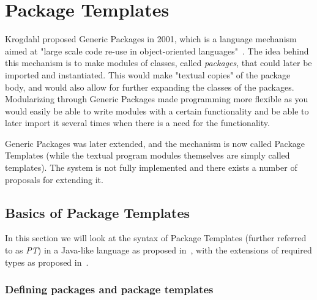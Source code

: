 \section{Package Templates}\label{sec:package-templates}


Krogdahl proposed Generic Packages in 2001, which is a language mechanism aimed at "large scale code re-use in object-oriented languages"~\cite{krogdahl:GP}.
The idea behind this mechanism is to make modules of classes, called \textit{packages}, that could later be imported and instantiated.
This would make "textual copies" of the package body, and would also allow for further expanding the classes of the packages.
Modularizing through Generic Packages made programming more flexible as you would easily be able to write modules with a certain functionality and be able to later import it several times when there is a need for the functionality.

Generic Packages was later extended, and the mechanism is now called Package Templates (while the textual program modules themselves are simply called templates).
The system is not fully implemented and there exists a number of proposals for extending it.

\subsection{Basics of Package Templates}\label{subsec:basics-of-package-templates}

In this section we will look at the syntax of Package Templates (further referred to as \emph{PT}) in a Java-like language as proposed in~\cite{jot}, with the extensions of required types as proposed in~\cite{requiredtypes}.

\subsubsection{Defining packages and package templates}

